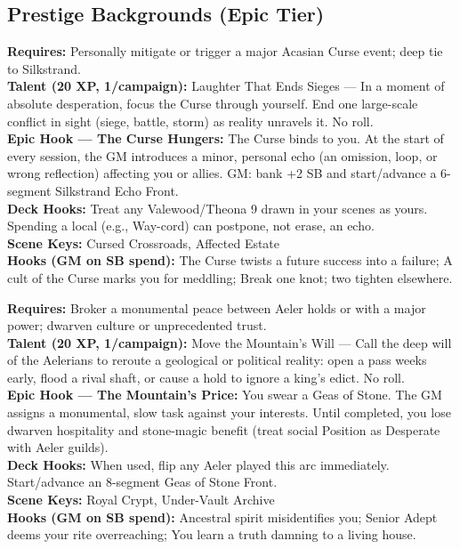 \documentclass[12pt]{article}
\begin{document}
\subsection*{Prestige Backgrounds (Epic Tier)}

\begin{description}[leftmargin=*]
  
  \item[\textbf{The Cursed Child of Silkstrand}] 
  \textbf{Requires:} Personally mitigate or trigger a major Acasian Curse event; deep tie to Silkstrand. \\
  \textbf{Talent (20 XP, 1/campaign):} Laughter That Ends Sieges — In a moment of absolute desperation, focus the Curse through yourself. End one large-scale conflict in sight (siege, battle, storm) as reality unravels it. No roll. \\
  \textbf{Epic Hook — The Curse Hungers:} The Curse binds to you. At the start of every session, the GM introduces a minor, personal echo (an omission, loop, or wrong reflection) affecting you or allies. GM: bank +2 SB and start/advance a 6-segment Silkstrand Echo Front. \\
  \textbf{Deck Hooks:} Treat any Valewood/Theona 9 drawn in your scenes as yours. Spending a local (e.g., Way-cord) can postpone, not erase, an echo. \\
  \textbf{Scene Keys:} Cursed Crossroads, Affected Estate \\
  \textbf{Hooks (GM on SB spend):} The Curse twists a future success into a failure; A cult of the Curse marks you for meddling; Break one knot; two tighten elsewhere.

  \item[\textbf{Stone-Speaker of Khaz-Vurim}] 
  \textbf{Requires:} Broker a monumental peace between Aeler holds or with a major power; dwarven culture or unprecedented trust. \\
  \textbf{Talent (20 XP, 1/campaign):} Move the Mountain's Will — Call the deep will of the Aelerians to reroute a geological or political reality: open a pass weeks early, flood a rival shaft, or cause a hold to ignore a king's edict. No roll. \\
  \textbf{Epic Hook — The Mountain's Price:} You swear a Geas of Stone. The GM assigns a monumental, slow task against your interests. Until completed, you lose dwarven hospitality and stone-magic benefit (treat social Position as Desperate with Aeler guilds). \\
  \textbf{Deck Hooks:} When used, flip any Aeler played this arc immediately. Start/advance an 8-segment Geas of Stone Front. \\
  \textbf{Scene Keys:} Royal Crypt, Under-Vault Archive \\
  \textbf{Hooks (GM on SB spend):} Ancestral spirit misidentifies you; Senior Adept deems your rite overreaching; You learn a truth damning to a living house.


\end{description}
\end{document}
